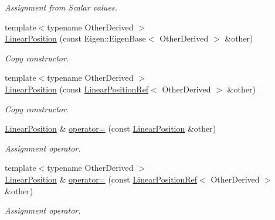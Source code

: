 \begin{DoxyCompactItemize}
\begin{DoxyCompactList}\small\item\em Assignment from Scalar values. \end{DoxyCompactList}\item 
{\footnotesize template$<$typename Other\+Derived $>$ }\\\hyperlink{classow__core_1_1LinearPosition_aaee24489f4658cb2302f28db12c5f678}{Linear\+Position} (const Eigen\+::\+Eigen\+Base$<$ Other\+Derived $>$ \&other)
\begin{DoxyCompactList}\small\item\em Copy constructor. \end{DoxyCompactList}\item 
{\footnotesize template$<$typename Other\+Derived $>$ }\\\hyperlink{classow__core_1_1LinearPosition_a77c88b88a92f55fada2c014b6ef8fa73}{Linear\+Position} (const \hyperlink{classow__core_1_1LinearPositionRef}{Linear\+Position\+Ref}$<$ Other\+Derived $>$ \&other)
\begin{DoxyCompactList}\small\item\em Copy constructor. \end{DoxyCompactList}\item 
\hyperlink{classow__core_1_1LinearPosition}{Linear\+Position} \& \hyperlink{classow__core_1_1LinearPosition_a6628eb895ecf535d004260c1ba9651d1}{operator=} (const \hyperlink{classow__core_1_1LinearPosition}{Linear\+Position} \&other)\hypertarget{classow__core_1_1LinearPosition_a6628eb895ecf535d004260c1ba9651d1}{}\label{classow__core_1_1LinearPosition_a6628eb895ecf535d004260c1ba9651d1}

\begin{DoxyCompactList}\small\item\em Assignment operator. \end{DoxyCompactList}\item 
{\footnotesize template$<$typename Other\+Derived $>$ }\\\hyperlink{classow__core_1_1LinearPosition}{Linear\+Position} \& \hyperlink{classow__core_1_1LinearPosition_a7ec1277ee7a445cb0295a54932cb88dc}{operator=} (const \hyperlink{classow__core_1_1LinearPositionRef}{Linear\+Position\+Ref}$<$ Other\+Derived $>$ \&other)\hypertarget{classow__core_1_1LinearPosition_a7ec1277ee7a445cb0295a54932cb88dc}{}\label{classow__core_1_1LinearPosition_a7ec1277ee7a445cb0295a54932cb88dc}

\begin{DoxyCompactList}\small\item\em Assignment operator. \end{DoxyCompactList}\end{DoxyCompactItemize}


